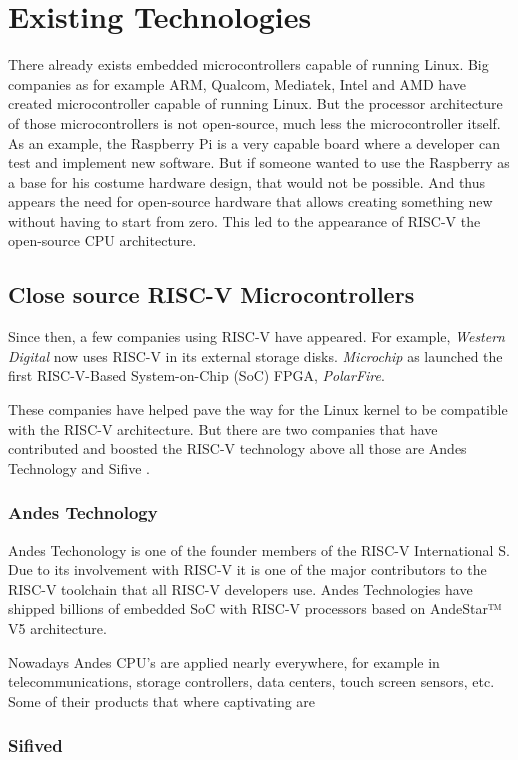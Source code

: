 \chapter{Existing Technologies}
There already exists embedded microcontrollers capable of running Linux. Big companies as for example ARM, Qualcom, Mediatek, Intel and AMD have created microcontroller capable of running Linux. But the processor architecture of those microcontrollers is not open-source, much less the microcontroller itself. As an example, the Raspberry Pi is a very capable board where a developer can test and implement new software. But if someone wanted to use the Raspberry as a base for his costume hardware design, that would not be possible. And thus appears the need for open-source hardware that allows creating something new without having to start from zero. This led to the appearance of RISC-V the open-source CPU architecture.

\section{Close source RISC-V Microcontrollers}
Since then, a few companies using RISC-V have appeared. For example, \textit{Western Digital} now uses RISC-V in its external storage disks. \textit{Microchip} as launched the first RISC-V-Based System-on-Chip (SoC) FPGA, \textit{PolarFire}. 

These companies have helped pave the way for the Linux kernel to be compatible with the RISC-V architecture. But there are two companies that have contributed and boosted the RISC-V technology above all those are Andes Technology and Sifive .

\subsection{Andes Technology}
Andes Techonology is one of the founder members of the RISC-V International S. Due to its involvement with RISC-V it is one of the major contributors to the RISC-V toolchain that all RISC-V developers use.  Andes Technologies have shipped billions of embedded SoC with RISC-V processors based on AndeStar™ V5 architecture.

Nowadays Andes CPU's are applied nearly everywhere, for example in telecommunications, storage controllers, data centers, touch screen sensors, etc. Some of their products that where captivating are 

\subsection{Sifived}


